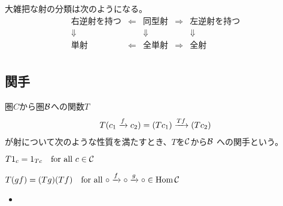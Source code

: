 	大雑把な射の分類は次のようになる。
	\begin{equation*}\begin{matrix} %
		\text{右逆射を持つ} &\Leftarrow& \text{同型射}
			&\Rightarrow& \text{左逆射を持つ} \\
		\Downarrow && \Downarrow && \Downarrow \\
		\text{単射} &\Leftarrow& \text{全単射} &\Rightarrow& \text{全射} \\
	\end{matrix}\end{equation*} %
\subsection{関手}\label{s2:関手} %
	\begin{definition}[関手]\label{def:関手} %
		圏$C$から圏${\mathcal{B}}$への関数$T$
		\begin{equation*}\begin{split} %
			T(c_1\xto{f}c_2) = (Tc_1)\xto{Tf}(Tc_2)
		\end{split}\end{equation*} %
		が射について次のような性質を満たすとき、$T$を${\mathcal{C}}$から${\mathcal{B}}$
		への関手という。
		\begin{description}\setlength{\itemsep}{-1mm} %
			\item[恒等射] $T1_c=1_{Tc}\quad\text{for all }c\in{\mathcal{C}}$
			\item[結合性] $T(gf)=(Tg)(Tf)\quad\text{for all }\circ\xrightarrow[{}]{f}\circ\xrightarrow[{}]{g}\circ\in\operatorname{Hom}{\mathcal{C}}$
		\end{description} %
		\begin{itemize}\setlength{\itemsep}{-1mm} %
			\item 
		\end{itemize} %
	\end{definition} %
\endgroup %
